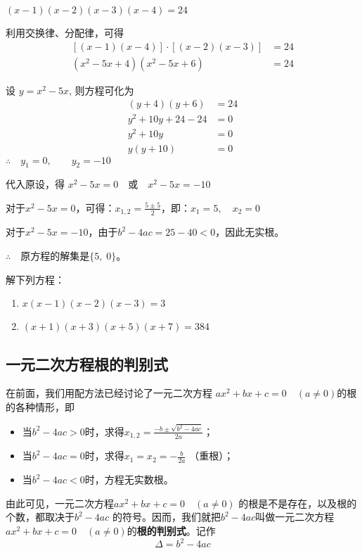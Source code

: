 \begin{solution}
    $(x-1)(x-2)(x-3)(x-4)=24$

    利用交换律、分配律，可得
    \[\begin{split}
        [(x-1)(x-4)]\cdot [(x-2)(x-3)]&=24\\
(x^2-5x+4)(x^2-5x+6)&=24
    \end{split}\]
    
    设 $y=x^2-5x$, 则方程可化为
   \[\begin{split}
       (y+4)(y+6)&=24\\
    y^2+10y+24-24&=0\\
    y^2+10y&=0\\
    y(y+10)&=0  
   \end{split}\]
   $\therefore\quad y_1=0,\qquad y_2=-10$

   代入原设，得
   $x^2-5x=0\quad \text{或}\quad    x^2-5x=-10$
   
   对于$x^2-5x=0$，可得：$x_{1,2}=\frac{5\pm 5}{2}$，即：$x_1=5,\quad x_2=0$

   对于$x^2-5x=-10$，由于$b^2-4ac=25-40<0$，因此无实根。

   $\therefore\quad $原方程的解集是$\{5,\; 0\}$。
\end{solution}

\begin{ex}
 解下列方程：   
\begin{enumerate}
    \item $x(x-1)(x-2)(x-3)=3$
    \item $(x+1)(x+3)(x+5)(x+7)=384$
\end{enumerate}
\end{ex}

\subsection{一元二次方程根的判别式}
在前面，我们用配方法已经讨论了一元二次方程
$ax^2+bx+c=0\quad (a\ne 0)$的根的各种情形，即
\begin{itemize}
    \item 当$b^2-4ac>0$时，求得$x_{1,2}=\frac{-b\pm\sqrt{b^2-4ac}}{2a}$；
\item     当$b^2-4ac=0$时，求得$x_1=x_2=-\frac{b}{2a}$ （重根）；
\item     当$b^2-4ac<0$时，方程无实数根。
\end{itemize}

由此可见，一元二次方程$ax^2+bx+c=0\quad (a\ne 0)$
的根是不是存在，以及根的个数，都取决于$b^2-4ac$
的符号。因而，我们就把$b^2-4ac$叫做一元二次方程
$ax^2+bx+c=0\quad (a\ne 0)$的\textbf{根的判别式}。记作
\[\Delta =b^2-4ac\]

